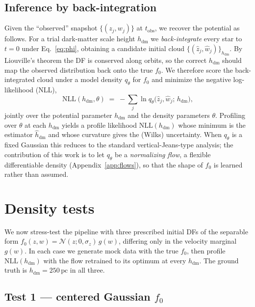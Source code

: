 \documentclass[11pt]{article}
\newcommand{\hdm}{h_{\mathrm{dm}}}
\newcommand{\pc}{\,\mathrm{pc}}
\newcommand{\ffo}{f_{0}}
\begin{document}
\subsection{Inference by back-integration}
\label{sec:backint}

Given the ``observed'' snapshot $\{(z_j,w_j)\}$ at $t_{\mathrm{obs}}$, we
recover the potential as follows. For a trial dark-matter scale height
$\hdm$ we \emph{back-integrate} every star to $t=0$ under
Eq.~\eqref{eq:phi}, obtaining a candidate initial cloud
$\{(\hat z_j,\hat w_j)\}_{\hdm}$. By Liouville's theorem the DF is conserved
along orbits, so the correct $\hdm$ should map the observed distribution
back onto the true $\ffo$. We therefore score the back-integrated cloud
under a model density $q_\theta$ for $\ffo$ and minimize the negative
log-likelihood (NLL),
%
\begin{equation}
\mathrm{NLL}(\hdm,\theta) \;=\;
-\sum_j \ln q_\theta\!\big(\hat z_j,\hat w_j;\,\hdm\big),
\label{eq:nll}
\end{equation}
%
jointly over the potential parameter $\hdm$ and the density parameters
$\theta$. Profiling over $\theta$ at each $\hdm$ yields a profile likelihood
$\mathrm{NLL}(\hdm)$ whose minimum is the estimator $\hat h_{\mathrm{dm}}$
and whose curvature gives the (Wilks) uncertainty. When $q_\theta$ is a
fixed Gaussian this reduces to the standard vertical-Jeans-type analysis;
the contribution of this work is to let $q_\theta$ be a \emph{normalizing
flow}, a flexible differentiable density (Appendix~\ref{app:flows}), so
that the shape of $\ffo$ is learned rather than assumed.

\section{Density tests}
\label{sec:tests}

We now stress-test the pipeline with three prescribed initial DFs of the
separable form $\ffo(z,w) = \mathcal{N}(z;0,\sigma_z)\,g(w)$, differing only
in the velocity marginal $g(w)$. In each case we generate mock data with the
true $\ffo$, then profile $\mathrm{NLL}(\hdm)$ with the flow retrained to its
optimum at every $\hdm$. The ground truth is $\hdm = 250\pc$ in all three.

\subsection{Test 1 --- centered Gaussian $\ffo$}
\label{sec:test1}
\end{document}

